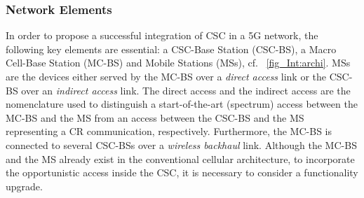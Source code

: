 \subsubsection*{Network Elements }
 In order to propose a successful integration of CSC in a 5G network, the following key elements are essential: a CSC-Base Station (CSC-BS), a Macro Cell-Base Station (MC-BS) and Mobile Stations (MSs), cf. \figurename~\ref{fig_Int:archi}. MSs are the devices either served by the MC-BS over a \textit{direct access} link or the CSC-BS over an \textit{indirect access} link. The direct access and the indirect access are the nomenclature used to distinguish a start-of-the-art (spectrum) access between the MC-BS and the MS from an access between the CSC-BS and the MS representing a CR communication, respectively. Furthermore, the MC-BS is connected to several CSC-BSs over a \textit{wireless backhaul} link. Although the MC-BS and the MS already exist in the conventional cellular architecture, to incorporate the opportunistic access inside the CSC, it is necessary to consider a functionality upgrade.

